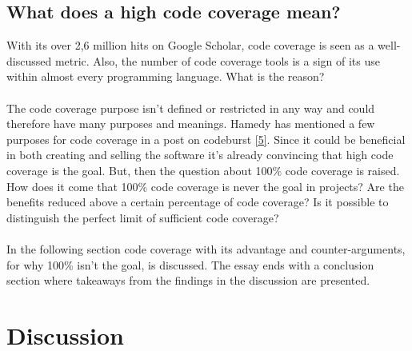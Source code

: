 \documentclass{article}
\begin{document}
\subsection{What does a high code coverage mean?}
With its over 2,6 million hits on Google Scholar, code coverage is seen as a well-discussed metric. Also, the number of code coverage tools is a sign of its use within almost every programming language. What is the reason?
\\\\
The code coverage purpose isn't defined or restricted in any way and could therefore have many purposes and meanings. Hamedy has mentioned a few purposes for code coverage in a post on codeburst \hyperlink{5}{[5]}. Since it could be beneficial in both creating and selling the software it's already convincing that high code coverage is the goal. But, then the question about 100\% code coverage is raised. How does it come that 100\% code coverage is never the goal in projects? Are the benefits reduced above a certain percentage of code coverage? Is it possible to distinguish the perfect limit of sufficient code coverage?
\\\\
In the following section code coverage with its advantage and counter-arguments, for why 100\% isn't the goal, is discussed. The essay ends with a conclusion section where takeaways from the findings in the discussion are presented. 

\section{Discussion}
\end{document}
